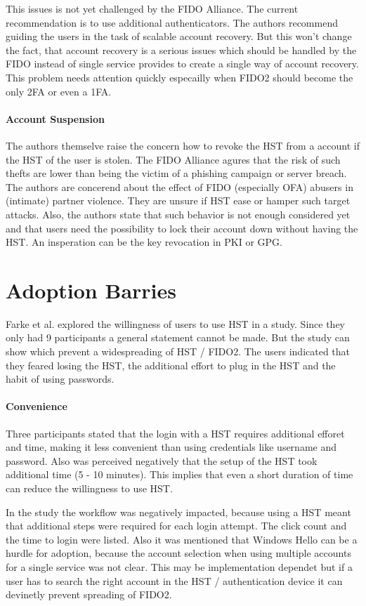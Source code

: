 \documentclass[runningheads]{llncs}
\begin{document}
This issues is not yet challenged by the FIDO Alliance. The current recommendation is to use additional authenticators. The authors recommend guiding the users in the task of scalable account recovery. But this won't change the fact, that account recovery is a serious issues which should be handled by the FIDO instead of single service provides to create a single way of account recovery. This problem needs attention quickly especailly when FIDO2 should become the only 2FA or even a 1FA. 

\paragraph{Account Suspension}
The authors themselve raise the concern how to revoke the HST from a account if the HST of the user is stolen. The FIDO Alliance agures that the risk of such thefts are lower than being the victim of a phishing campaign or server breach. The authors are concerend about the effect of FIDO (especially OFA) abusers in (intimate) partner violence. They are unsure if HST ease or hamper such target attacks. Also, the authors state that such behavior is not enough considered yet and that users need the possibility to lock their account down without having the HST. An insperation can be the key revocation in PKI or GPG. 

\section{Adoption Barries}
Farke et al. explored the willingness of users to use HST in a study. Since they only had 9 participants a general statement cannot be made. But the study can show which prevent a widespreading of HST / FIDO2. The users indicated that they feared losing the HST, the additional effort to plug in the HST and the habit of using passwords.

\paragraph{Convenience}
Three participants stated that the login with a HST requires additional efforet and time, making it less convenient than using credentials like username and password. Also was perceived negatively that the setup of the HST took additional time (5 - 10 minutes). This implies that even a short duration of time can reduce the willingness to use HST.

In the study the workflow was negatively impacted, because using a HST meant that additional steps were required for each login attempt. The click count and the time to login were listed. Also it was mentioned that Windows Hello can be a hurdle for adoption, because the account selection when using multiple accounts for a single service was not clear. This may be implementation dependet but if a user has to search the right account in the HST / authentication device it can devinetly prevent spreading of FIDO2. 
\end{document}

